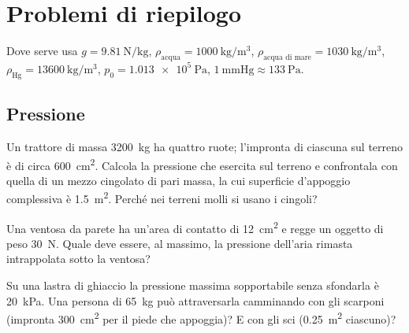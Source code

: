 \section{Problemi di riepilogo}

Dove serve usa $g = \SI{9,81}{\newton\per\kilo\gram}$, $\rho_\text{acqua} = \SI{1000}{\kilo\gram\per\metre\cubed}$, $\rho_\text{acqua di mare} = \SI{1030}{\kilo\gram\per\metre\cubed}$, $\rho_\text{Hg} = \SI{13600}{\kilo\gram\per\metre\cubed}$, $p_0 = \SI{1,013e5}{\pascal}$, $\SI{1}{\mmHg} \approx \SI{133}{\pascal}$.

\subsection*{Pressione}

\begin{esercizio}
Un trattore di massa \SI{3200}{\kilo\gram} ha quattro ruote; l'impronta di ciascuna sul terreno è di circa \SI{600}{\centi\metre\squared}. Calcola la pressione che esercita sul terreno e confrontala con quella di un mezzo cingolato di pari massa, la cui superficie d'appoggio complessiva è \SI{1,5}{\metre\squared}. Perché nei terreni molli si usano i cingoli?\\
\end{esercizio}

\begin{esercizio}
Una ventosa da parete ha un'area di contatto di \SI{12}{\centi\metre\squared} e regge un oggetto di peso \SI{30}{\newton}. Quale deve essere, al massimo, la pressione dell'aria rimasta intrappolata sotto la ventosa?\\
\end{esercizio}

\begin{esercizio}
Su una lastra di ghiaccio la pressione massima sopportabile senza sfondarla è \SI{20}{\kilo\pascal}. Una persona di \SI{65}{\kilo\gram} può attraversarla camminando con gli scarponi (impronta \SI{300}{\centi\metre\squared} per il piede che appoggia)? E con gli sci (\SI{0,25}{\metre\squared} ciascuno)?\\
\end{esercizio}

